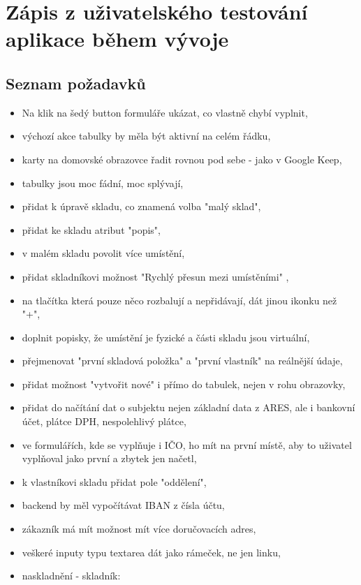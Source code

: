 \chapter{Zápis z uživatelského testování aplikace během vývoje} \label{ap:testing_notes}

\section{Seznam požadavků}

\begin{itemize}
	\item Na klik na šedý button formuláře ukázat, co vlastně chybí vyplnit,
	\item výchozí akce tabulky by měla být aktivní na celém řádku,
	\item karty na domovské obrazovce řadit rovnou pod sebe - jako v Google Keep,
	\item tabulky jsou moc fádní, moc splývají,
	\item přidat k úpravě skladu, co znamená volba "malý sklad",
	\item přidat ke skladu atribut "popis",
	\item v malém skladu povolit více umístění,
	\item přidat skladníkovi možnost "Rychlý přesun mezi umístěními" ,
	\item na tlačítka která pouze něco rozbalují a nepřidávají, dát jinou ikonku než "+",
	\item doplnit popisky, že umístění je fyzické a části skladu jsou virtuální,
	\item přejmenovat "první skladová položka" a "první vlastník" na reálnější údaje,
	\item přidat možnost "vytvořit nové" i přímo do tabulek, nejen v rohu obrazovky,
	\item přidat do načítání dat o subjektu nejen základní data z ARES, ale i bankovní účet, plátce DPH, nespolehlivý plátce,
	\item ve formulářích, kde se vyplňuje i IČO, ho mít na první místě, aby to uživatel vyplňoval jako první a zbytek jen načetl,
	\item k vlastníkovi skladu přidat pole "oddělení",
	\item backend by měl vypočítávat IBAN z čísla účtu,
	\item zákazník má mít možnost mít více doručovacích adres,
	\item veškeré inputy typu textarea dát jako rámeček, ne jen linku,
	\item naskladnění - skladník:

\end{itemize}
